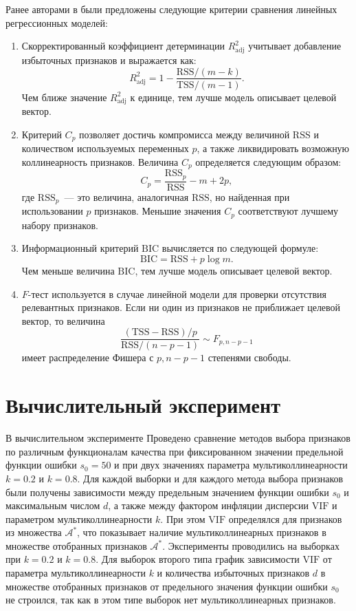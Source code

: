 \documentclass[a4paper,12pt]{article}
\newcommand{\bw}{\mathbf{w}}
\newcommand{\calC}{\mathcal{C}}
\newcommand{\calA}{\mathcal{A}}
\newcommand{\vif}{\mathrm{VIF}}
\newcommand{\rss}{\mathrm{RSS}}
\newcommand{\tss}{\mathrm{TSS}}
\newcommand{\bic}{\mathrm{BIC}}
\newcommand{\radj}{R_{\text{adj}}^2}
\theoremstyle{plain}
\begin{document}
Ранее авторами в \cite{multCausesEffectsRemedies,Krymova} были предложены следующие критерии сравнения линейных регрессионных моделей:
\begin{enumerate}
\item Скорректированный коэффициент детерминации $\radj$ учитывает добавление избыточных признаков и выражается как:
\[
\radj = 1 - \frac{\rss / (m - k)}{\tss / (m - 1)}.
\]
Чем ближе значение $\radj$ к единице, тем лучше модель описывает целевой вектор.
\item Критерий $C_p$ позволяет достичь компромисса между величиной $\rss$ и количеством используемых переменных $p$, а также ликвидировать возможную коллинеарность признаков. Величина $C_p$ определяется следующим образом:
\[
C_p = \frac{\rss_p}{\rss} - m + 2p,
\]
где $\rss_p$~--- это величина, аналогичная $\rss$, но найденная при использовании $p$ признаков. Меньшие значения $C_p$ соответствуют лучшему набору признаков.    
\item Информационный критерий $\bic$ вычисляется по следующей формуле:
\[
\bic = \rss + p \log m.
\]
Чем меньше величина $\bic$, тем лучше модель описывает целевой вектор.
\item $F$-тест используется в случае линейной модели для проверки отсутствия релевантных признаков. Если ни один из признаков не приближает целевой вектор, то величина 
\[
\frac{(\tss - \rss) / p}{\rss / (n - p - 1)} \sim F_{p, n - p -1}
\]
имеет распределение Фишера с $p, n-p-1$ степенями свободы. 
\end{enumerate}

    

\section{Вычислительный эксперимент}
В вычислительном эксперименте 
Проведено сравнение методов выбора признаков по различным функционалам качества при фиксированном значении предельной функции ошибки $s_0 = 50$ и при двух значениях параметра мультиколлинеарности $k = 0.2$ и $k = 0.8$. Для каждой выборки и для каждого метода выбора признаков были получены зависимости между предельным значением функции ошибки $s_0$ и максимальным числом $d$, а также между фактором инфляции дисперсии $\vif$ и параметром мультиколлинеарности $k$. При этом $\vif$ определялся для признаков из множества $\calA^*$, что показывает наличие мультиколлинеарных признаков в множестве отобранных признаков $\calA^*$.  Эксперименты проводились на выборках при $k = 0.2$ и $k = 0.8$. Для выборок второго типа график зависимости $\vif$ от параметра мультиколлинеарности $k$ и количества избыточных признаков $d$ в множестве отобранных признаков от предельного значения функции ошибки $s_0$ не строился, так как в этом типе выборок нет мультиколлинеарных признаков. 
\end{document}
